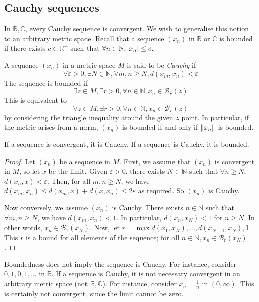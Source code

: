 \subsection{Cauchy sequences}
In \( \mathbb R, \mathbb C \), every Cauchy sequence is convergent.
We wish to generalise this notion to an arbitrary metric space.
Recall that a sequence \( (x_n) \) in \( \mathbb R \) or \( \mathbb C \) is bounded if there exists \( c \in \mathbb R^+ \) such that \( \forall n \in \mathbb N, \abs{x_n} \leq c \).
\begin{definition}
	A sequence \( (x_n) \) in a metric space \( M \) is said to be \textit{Cauchy} if
	\[
		\forall \varepsilon > 0, \exists N \in \mathbb N, \forall m,n \geq N, d(x_m,x_n) < \varepsilon
	\]
	The sequence is bounded if
	\[
		\exists z \in M, \exists r > 0, \forall n \in \mathbb N, x_n \in \mathcal B_r(z)
	\]
	This is equivalent to
	\[
		\forall z \in M, \exists r > 0, \forall n \in \mathbb N, x_n \in \mathcal B_r(z)
	\]
	by considering the triangle inequality around the given \( z \) point.
	In particular, if the metric arises from a norm, \( (x_n) \) is bounded if and only if \( \norm{x_n} \) is bounded.
\end{definition}
\begin{lemma}
	If a sequence is convergent, it is Cauchy.
	If a sequence is Cauchy, it is bounded.
\end{lemma}
\begin{proof}
	Let \( (x_n) \) be a sequence in \( M \).
	First, we assume that \( (x_n) \) is convergent in \( M \), so let \( x \) be the limit.
	Given \( \varepsilon > 0 \), there exists \( N \in \mathbb N \) such that \( \forall n \geq N \), \( d(x_n, x) < \varepsilon \).
	Then, for all \( m, n \geq N \), we have \( d(x_m, x_n) \leq d(x_m, x) + d(x, x_n) \leq 2\varepsilon \) as required.
	So \( (x_n) \) is Cauchy.

	Now conversely, we assume \( (x_n) \) is Cauchy.
	There exists \( n \in \mathbb N \) such that \( \forall m, n \geq N \), we have \( d(x_m, x_n) < 1 \).
	In particular, \( d(x_n, x_N) < 1 \) for \( n \geq N \).
	In other words, \( x_n \in \mathcal B_1(x_N) \).
	Now, let \( r = \max{d(x_1, x_N), \dots, d(x_{N-1}, x_N), 1} \).
	This \( r \) is a bound for all elements of the sequence; for all \( n \in \mathbb N, x_n \in \mathcal B_r(x_N) \).
\end{proof}
\begin{remark}
	Boundedness does not imply the sequence is Cauchy.
	For instance, consider \( 0,1,0,1,\dots \) in \( \mathbb R \).
	If a sequence is Cauchy, it is not necessary convergent in an arbitrary metric space (not \( \mathbb R, \mathbb C \)).
	For instance, consider \( x_n = \frac{1}{n} \) in \( (0, \infty) \).
	This is certainly not convergent, since the limit cannot be zero.
\end{remark}

